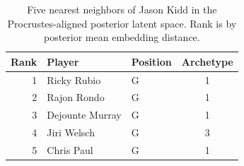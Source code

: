 \begin{table}[htbp]
  \centering\small
  \begin{tabular}{rllc}
    \toprule
    Rank & Player & Position & Archetype \\
    \midrule
    1 & Ricky Rubio & G & 1 \\
    2 & Rajon Rondo & G & 1 \\
    3 & Dejounte Murray & G & 1 \\
    4 & Jiri Welsch & G & 3 \\
    5 & Chris Paul & G & 1 \\
    \bottomrule
  \end{tabular}
  \caption{Five nearest neighbors of Jason Kidd in the Procrustes-aligned posterior latent space. Rank is by posterior mean embedding distance.}
  \label{tab:Jason_Kidd_neighbors}
\end{table}

